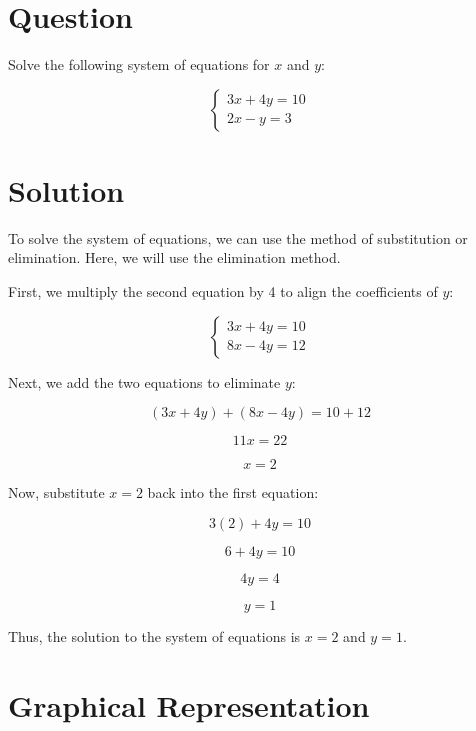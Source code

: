 \documentclass{article}
\begin{document}
\section*{Question}

Solve the following system of equations for \(x\) and \(y\):

\[
\begin{cases}
3x + 4y = 10 \\
2x - y = 3
\end{cases}
\]

\section*{Solution}

To solve the system of equations, we can use the method of substitution or elimination. Here, we will use the elimination method.

First, we multiply the second equation by 4 to align the coefficients of \(y\):

\[
\begin{cases}
3x + 4y = 10 \\
8x - 4y = 12
\end{cases}
\]

Next, we add the two equations to eliminate \(y\):

\[
(3x + 4y) + (8x - 4y) = 10 + 12
\]

\[
11x = 22
\]

\[
x = 2
\]

Now, substitute \(x = 2\) back into the first equation:

\[
3(2) + 4y = 10
\]

\[
6 + 4y = 10
\]

\[
4y = 4
\]

\[
y = 1
\]

Thus, the solution to the system of equations is \(x = 2\) and \(y = 1\).

\section*{Graphical Representation}

\end{document}
